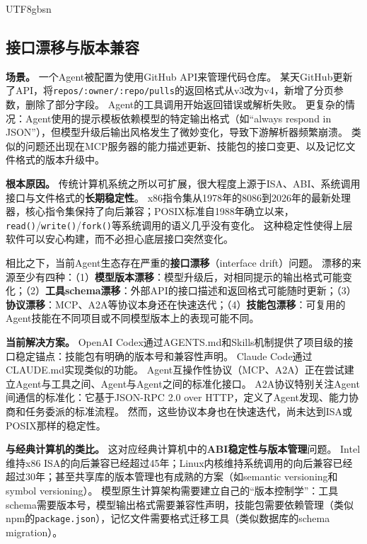 \documentclass[11pt,a4paper]{article}
\begin{document}
\begin{CJK*}{UTF8}{gbsn}
\subsection{接口漂移与版本兼容}

\textbf{场景。}
一个Agent被配置为使用GitHub API来管理代码仓库。
某天GitHub更新了API，将\texttt{repos/:owner/:repo/pulls}的返回格式从v3改为v4，新增了分页参数，删除了部分字段。
Agent的工具调用开始返回错误或解析失败。
更复杂的情况：Agent使用的提示模板依赖模型的特定输出格式（如``always respond in JSON''），但模型升级后输出风格发生了微妙变化，导致下游解析器频繁崩溃。
类似的问题还出现在MCP服务器的能力描述更新、技能包的接口变更、以及记忆文件格式的版本升级中。

\textbf{根本原因。}
传统计算机系统之所以可扩展，很大程度上源于ISA、ABI、系统调用接口与文件格式的\textbf{长期稳定性}。
x86指令集从1978年的8086到2026年的最新处理器，核心指令集保持了向后兼容；POSIX标准自1988年确立以来，\texttt{read()}/\texttt{write()}/\texttt{fork()}等系统调用的语义几乎没有变化\cite{ostep_2023}。
这种稳定性使得上层软件可以安心构建，而不必担心底层接口突然变化。

相比之下，当前Agent生态存在严重的\textbf{接口漂移}（interface drift）问题。
漂移的来源至少有四种：（1）\textbf{模型版本漂移}：模型升级后，对相同提示的输出格式可能变化；（2）\textbf{工具schema漂移}：外部API的接口描述和返回格式可能随时更新\cite{mcp_intro_2026}；（3）\textbf{协议漂移}：MCP、A2A等协议本身还在快速迭代\cite{agentprotocols2025,google_a2a_2025}；（4）\textbf{技能包漂移}：可复用的Agent技能在不同项目或不同模型版本上的表现可能不同。

\textbf{当前解决方案。}
OpenAI Codex通过AGENTS.md\cite{openai_codex_agents_md_2026}和Skills\cite{openai_codex_skills_2026}机制提供了项目级的接口稳定锚点：技能包有明确的版本号和兼容性声明。
Claude Code通过CLAUDE.md\cite{anthropic_claudecode_memory_2026}实现类似的功能。
Agent互操作性协议（MCP\cite{mcp_intro_2026}、A2A\cite{google_a2a_2025}）正在尝试建立Agent与工具之间、Agent与Agent之间的标准化接口。
A2A协议特别关注Agent间通信的标准化：它基于JSON-RPC 2.0 over HTTP，定义了Agent发现、能力协商和任务委派的标准流程\cite{google_a2a_2025}。
然而，这些协议本身也在快速迭代，尚未达到ISA或POSIX那样的稳定性。

\textbf{与经典计算机的类比。}
这对应经典计算机中的\textbf{ABI稳定性与版本管理}问题。
Intel维持x86 ISA的向后兼容已经超过45年；Linux内核维持系统调用的向后兼容已经超过30年；甚至共享库的版本管理也有成熟的方案（如semantic versioning和symbol versioning）。
模型原生计算架构需要建立自己的``版本控制学''：工具schema需要版本号，模型输出格式需要兼容性声明，技能包需要依赖管理（类似npm的\texttt{package.json}），记忆文件需要格式迁移工具（类似数据库的schema migration）。


\end{CJK*}
\end{document}
